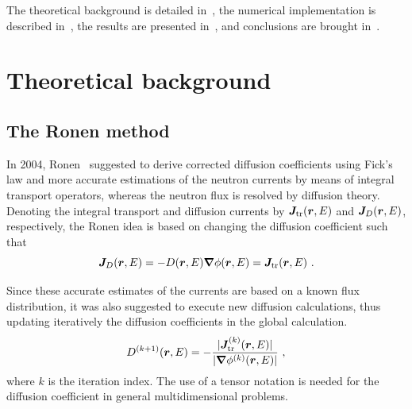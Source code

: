 
The theoretical background is detailed in~, the numerical implementation is described in~, the results are presented in~, and conclusions are brought in~.

%
\section{Theoretical background}
\label{sec:theory}

%
\subsection{The Ronen method}
\label{sec:RM}

In 2004, Ronen~\cite{Ronen-2004} suggested to derive corrected diffusion coefficients using Fick's law and more accurate estimations of the neutron currents by means of integral transport operators, whereas the neutron flux is resolved by diffusion theory. Denoting the integral transport and diffusion currents by $\bm{J}_{\textrm{\scriptsize{tr}}}(\bm{r},E)$ and $\bm{J}_D(\bm{r},E)$, respectively, the Ronen idea is based on changing the diffusion coefficient such that
\begin{equation}\label{eq:Fick}
\bm{J}_D(\bm{r},E) = -D(\bm{r},E)\bm{\nabla}\phi(\bm{r},E) = \bm{J}_{\textrm{\scriptsize{tr}}}(\bm{r},E) \,\, . 
\end{equation}

Since these accurate estimates of the currents are based on a known flux distribution, it was also suggested to execute new diffusion calculations, thus updating iteratively the diffusion coefficients in the global calculation. 
\begin{equation}\label{eq:RM-it}
D^{(k+1)}(\bm{r},E) = -\frac{\lvert\bm{J}_{\textrm{\scriptsize{tr}}}^{(k)}(\bm{r},E)\rvert}{\lvert\bm{\nabla}\phi^{(k)}(\bm{r},E)\rvert} \,\, ,
\end{equation}
where $k$ is the iteration index. The use of a tensor notation is needed for the diffusion coefficient in general multidimensional problems.

